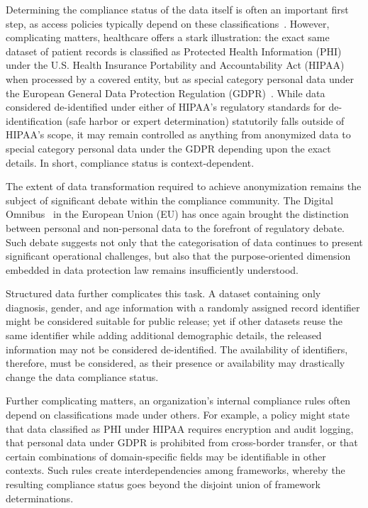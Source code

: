 \documentclass[runningheads,oneside]{llncs}
\begin{document}
Determining the compliance status of the data itself is often an important first step, as access policies typically depend on these classifications~\cite{xacml,nist-sp-800-95,nist-ir-7657}. However, complicating matters, healthcare offers a stark illustration: the exact same dataset of patient records is classified as Protected Health Information (PHI) under the U.S. Health Insurance Portability and Accountability Act (HIPAA)~\cite{hipaa-privacy} when processed by a covered entity, but as special category personal data under the European General Data Protection Regulation (GDPR)~\cite{gdpr}. While data considered de-identified under either of HIPAA's regulatory standards for de-identification (safe harbor or expert determination) statutorily falls outside of HIPAA's scope, it may remain controlled as anything from anonymized data to special category personal data under the GDPR depending upon the exact details. In short, compliance status is context-dependent.

The extent of data transformation required to achieve anonymization remains the subject of significant debate within the compliance community. The Digital Omnibus~\cite{digital_omnibus} in the European Union (EU) has once again brought the distinction between personal and non-personal data to the forefront of regulatory debate. Such debate suggests not only that the categorisation of data continues to present significant operational challenges, but also that the purpose-oriented dimension embedded in data protection law remains insufficiently understood.

Structured data further complicates this task. A dataset containing only diagnosis, gender, and age information with a randomly assigned record identifier might be considered suitable for public release; yet if other datasets reuse the same identifier while adding additional demographic details, the released information may not be considered de-identified. The availability of identifiers, therefore, must be considered, as their presence or availability may drastically change the data compliance status.

Further complicating matters, an organization's internal compliance rules often depend on classifications made under others. For example, a policy might state that data classified as PHI under HIPAA requires encryption and audit logging, that personal data under GDPR is prohibited from cross-border transfer, or that certain combinations of domain-specific fields may be identifiable in other contexts. Such rules create interdependencies among frameworks, whereby the resulting compliance status goes beyond the disjoint union of framework determinations.
\end{document}
